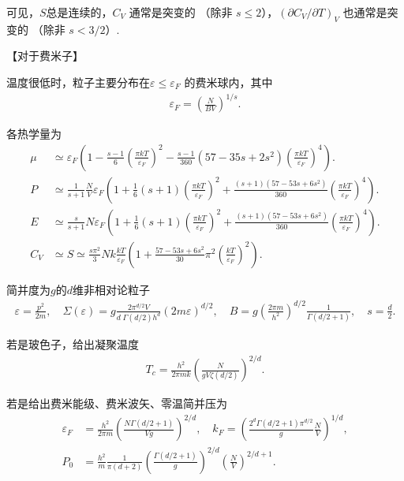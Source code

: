 可见，\(S\)总是连续的，\(C_{V}\) 通常是突变的 （除非 \(s \le 2\)），\(\left(\partial C_{V}/\partial T\right)_{V}\) 也通常是突变的 （除非 \(s < 3/2\)）.

【对于费米子】

温度很低时，粒子主要分布在\(\varepsilon \le \varepsilon_{F}\) 的费米球内，其中
\begin{align*}
	\varepsilon_{F} = \left( \frac{N}{B V} \right)^{1/s}.
\end{align*}

各热学量为
\begin{align*}
	\mu &\simeq \varepsilon_{F} \left( 1 - \frac{s-1}{6} \left( \frac{\pi k T}{\varepsilon_{F}} \right)^{2} - \frac{s-1}{360} (57 - 35 s + 2 s^{2}) \left( \frac{\pi k T}{\varepsilon_{F}} \right)^{4} \right). \\
	P &\simeq \frac{1}{s+1} \frac{N}{V} \varepsilon_{F} \left( 1 + \frac{1}{6} (s+1) \left( \frac{\pi k T}{\varepsilon_{F}} \right)^{2} + \frac{(s+1)(57 - 53 s + 6 s^{2})}{360} \left( \frac{\pi k T}{\varepsilon_{F}} \right)^{4} \right). \\
	E &\simeq \frac{s}{s+1} N \varepsilon_{F} \left( 1 + \frac{1}{6} (s+1) \left( \frac{\pi k T}{\varepsilon_{F}} \right)^{2} + \frac{(s+1)(57 - 53 s + 6 s^{2})}{360} \left( \frac{\pi k T}{\varepsilon_{F}} \right)^{4} \right). \\
	C_{V} &\simeq S \simeq \frac{s \pi^{2}}{3} N k \frac{k T}{\varepsilon_{F}} \left( 1 + \frac{57 - 53 s + 6 s^{2}}{30} \pi^{2} \left( \frac{k T}{\varepsilon_{F}} \right)^{2} \right).
\end{align*}

\begin{exbox}
	简并度为\(g\)的\(d\)维非相对论粒子
	\begin{align*}
		\varepsilon = \frac{p^{2}}{2m}, \quad \Sigma(\varepsilon) = g \frac{2 \pi^{d/2} V}{d\; \Gamma(d/2) h^{d}} (2m \varepsilon)^{d/2}, \quad B = g \left( \frac{2 \pi m}{h^{2}} \right)^{d/2} \frac{1}{\Gamma(d/2+1)}, \quad s = \frac{d}{2}.
	\end{align*}

	若是玻色子，给出凝聚温度
	\begin{align*}
		T_c=\frac{h^2}{2\pi m k}\left(\frac{N}{gV\zeta(d/2)}\right)^{2/d}.
	\end{align*}

	若是给出费米能级、费米波矢、零温简并压为
	\begin{align*}
    \varepsilon_{F} &= \frac{h^{2}}{2\pi m} \left( \frac{N \Gamma(d/2+1)}{V g} \right)^{2/d},\quad
    k_{F} = \left( \frac{2^{d} \Gamma(d/2+1) \pi^{d/2}}{g} \frac{N}{V} \right)^{1/d},\\
    P_0 &= \frac{h^{2}}{m} \frac{1}{\pi (d+2)} \left( \frac{\Gamma(d/2+1)}{g} \right)^{2/d} \left( \frac{N}{V} \right)^{2/d + 1}.
	\end{align*}
\end{exbox}

